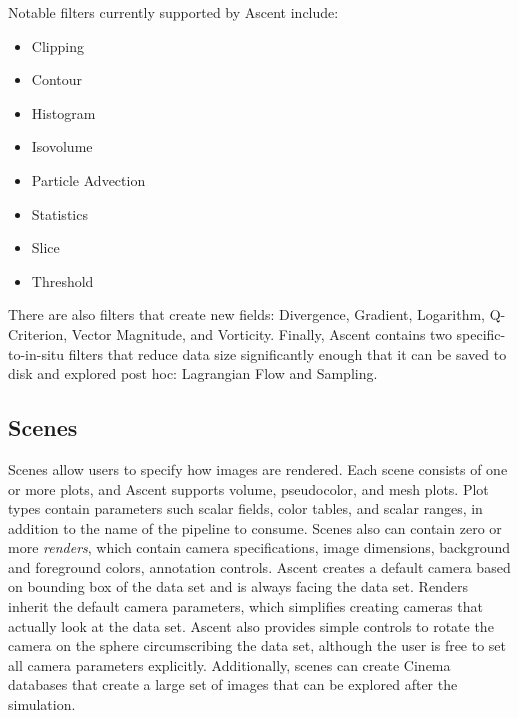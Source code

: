 %


Notable filters currently supported by Ascent include:
\begin{multicols}{2}
\begin{itemize}
\item Clipping
\item Contour
\item Histogram
\item Isovolume
\item Particle Advection
\item Statistics
\item Slice
\item Threshold
\end{itemize}
\end{multicols}

There are also filters that create new fields: Divergence, Gradient, Logarithm, Q-Criterion, Vector Magnitude, and Vorticity.
%
Finally, Ascent contains two specific-to-in-situ filters that 
reduce data size significantly enough that it can be saved to disk and explored post hoc: 
Lagrangian Flow and Sampling.


\subsection{Scenes}

Scenes allow users to specify how images are rendered.
%
Each scene consists of one or more plots, and Ascent supports volume,
pseudocolor, and mesh plots.
%
Plot types contain parameters such scalar fields, color tables, and scalar ranges,
in addition to the name of the pipeline to consume.
%
Scenes also can contain zero or more \textit{renders}, which contain
camera specifications, image dimensions, background and
foreground colors, annotation controls.
%
Ascent creates a default camera based on bounding box of the data set and
is always facing the data set.
%
Renders inherit the default camera parameters, which simplifies creating
cameras that actually look at the data set.
%
Ascent also provides simple controls to rotate the camera on the
sphere circumscribing the data set, although the user is free to set all
camera parameters explicitly.
%
Additionally, scenes can create Cinema~\cite{AhrensCinema} databases that
create a large set of images that can be explored after the simulation.

